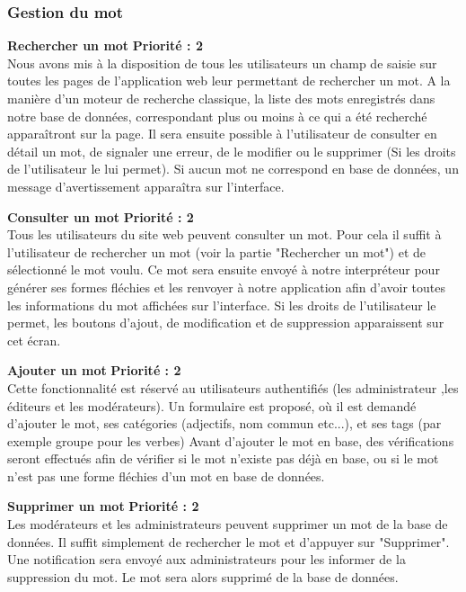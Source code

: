 \documentclass[12pt,a4paper]{article}
\begin{document}
\subsubsection{Gestion du mot}
\textbf{Rechercher un mot}
 \textbf{Priorité : 2}
\\ Nous avons mis à la disposition de tous les utilisateurs un champ de saisie sur toutes les pages de l'application web leur permettant de rechercher un mot. A la manière d'un moteur de recherche classique, la liste des mots enregistrés dans notre base de données, correspondant plus ou moins à ce qui a été recherché apparaîtront sur la page. Il sera ensuite possible à l'utilisateur de consulter en détail un mot, de signaler une erreur, de le modifier ou le supprimer (Si les droits de l'utilisateur le lui permet). Si aucun mot ne correspond en base de données, un message d'avertissement apparaîtra sur l'interface.


\textbf{Consulter un mot}
 \textbf{Priorité : 2}
\\ Tous les utilisateurs du site web peuvent consulter un mot. Pour cela il suffit à l'utilisateur de rechercher un mot (voir la partie "Rechercher un mot") et de sélectionné le mot voulu. Ce mot sera ensuite envoyé à notre interpréteur pour générer ses formes fléchies et les renvoyer à notre application afin d'avoir toutes les informations du mot affichées sur l'interface.
Si les droits de l'utilisateur le permet, les boutons d'ajout, de modification et de suppression apparaissent sur cet écran.


\textbf{Ajouter un mot}
 \textbf{Priorité : 2}
\\ Cette fonctionnalité est réservé au utilisateurs authentifiés (les administrateur ,les éditeurs et les modérateurs). Un formulaire est proposé, où il est demandé d'ajouter le mot, ses catégories (adjectifs, nom commun etc...), et ses tags (par exemple groupe pour les verbes)
Avant d'ajouter le mot en base, des vérifications seront effectués afin  de vérifier si le mot n'existe pas déjà en base, ou si le mot n'est pas une forme fléchies d'un mot en base de données.


\textbf{Supprimer un mot}
 \textbf{Priorité : 2} \\ 
 Les modérateurs et les administrateurs peuvent supprimer un mot de la base de données. Il suffit simplement de rechercher le mot et d'appuyer sur "Supprimer". Une notification sera envoyé aux administrateurs pour les informer de la suppression du mot. Le mot sera alors supprimé de la base de données.
\end{document}
